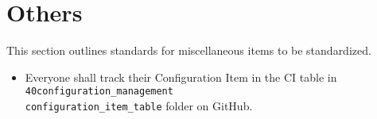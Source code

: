 \section{Others}
This section outlines standards for miscellaneous items to be standardized.

\begin{itemize}
	\item Everyone shall track their Configuration Item in the CI table in \texttt{40configuration\_management\\configuration\_item\_table} folder on GitHub.
\end{itemize}